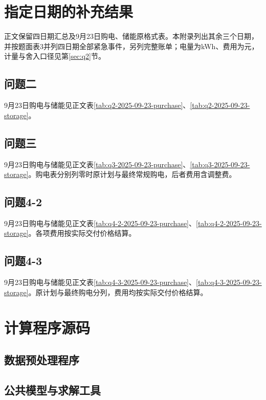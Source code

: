 \section{指定日期的补充结果}\label{app:specified-dates}
正文保留四日期汇总及9月23日购电、储能原格式表。本附录列出其余三个日期，并按题面表3并列四日期全部紧急事件，另列完整账单；电量为kWh、费用为元，计量与舍入口径见第\ref{sec:q2}节。

\subsection{问题二}\label{app:q2-days}
9月23日购电与储能见正文表\ref{tab:q2-2025-09-23-purchase}、\ref{tab:q2-2025-09-23-storage}。

\subsection{问题三}\label{app:q3-days}
9月23日购电与储能见正文表\ref{tab:q3-2025-09-23-purchase}、\ref{tab:q3-2025-09-23-storage}。购电表分别列零时原计划与最终常规购电，后者费用含调整费。

\subsection{问题4-2}\label{app:q4-2-days}
9月23日购电与储能见正文表\ref{tab:q4-2-2025-09-23-purchase}、\ref{tab:q4-2-2025-09-23-storage}。各项费用按实际交付价格结算。

\subsection{问题4-3}\label{app:q4-3-days}
9月23日购电与储能见正文表\ref{tab:q4-3-2025-09-23-purchase}、\ref{tab:q4-3-2025-09-23-storage}。原计划与最终购电分列，费用均按实际交付价格结算。

\clearpage

\clearpage
\section{计算程序源码}\label{app:support}

\subsection{数据预处理程序}\label{app:source-prepare}


\clearpage
\subsection{公共模型与求解工具}\label{app:source-model}



